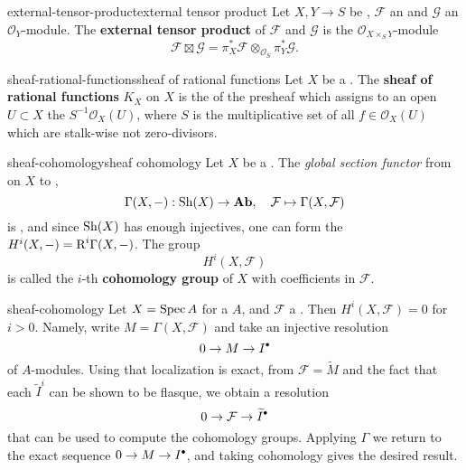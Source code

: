\begin{topic}{external-tensor-product}{external tensor product}
    Let $X, Y \to S$ be , $\mathcal{F}$ an  and $\mathcal{G}$ an $\mathcal{O}_Y$-module. The \textbf{external tensor product} of $\mathcal{F}$ and $\mathcal{G}$ is the $\mathcal{O}_{X \times_S Y}$-module
    \[ \mathcal{F} \boxtimes \mathcal{G} = \pi_X^* \mathcal{F} \otimes_{\mathcal{O}_S} \pi_Y^* \mathcal{G} . \]
\end{topic}

\begin{topic}{sheaf-rational-functions}{sheaf of rational functions}
    Let $X$ be a . The \textbf{sheaf of rational functions} $K_X$ on $X$ is the  of the presheaf which assigns to an open $U \subset X$ the  $S^{-1} \mathcal{O}_X(U)$, where $S$ is the multiplicative set of all $f \in \mathcal{O}_X(U)$ which are stalk-wise not zero-divisors.
\end{topic}

\begin{topic}{sheaf-cohomology}{sheaf cohomology}
    Let $X$ be a . The \textit{global section functor} from  on $X$ to ,
    \[ \Gamma(X, -) : \textup{Sh}(X) \to \textbf{Ab} , \quad \mathcal{F} \mapsto \Gamma(X, \mathcal{F}) \]
    is , and since $\textup{Sh}(X)$ has enough injectives, one can form the  $H^i(X, -) = \textup{R}^i \Gamma(X, -)$. The group
    \[ H^i(X, \mathcal{F}) \]
    is called the $i$-th \textbf{cohomology group} of $X$ with coefficients in $\mathcal{F}$.
\end{topic}

\begin{example}{sheaf-cohomology}
    Let $X = \operatorname{Spec} A$ for a  $A$, and $\mathcal{F}$ a . Then $H^i(X, \mathcal{F}) = 0$ for $i > 0$. Namely, write $M = \Gamma(X, \mathcal{F})$ and take an injective resolution
    \[ 0 \to M \to I^\bdot \]
    of $A$-modules. Using that localization is exact, from $\mathcal{F} = \widetilde{M}$ and the fact that each $\widetilde{I}^i$ can be shown to be flasque, we obtain a resolution
    \[ 0 \to \mathcal{F} \to \widetilde{I}^\bdot \]
    that can be used to compute the cohomology groups. Applying $\Gamma$ we return to the exact sequence $0 \to M \to I^\bdot$, and taking cohomology gives the desired result.
\end{example}

